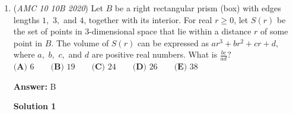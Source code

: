 \begin{enumerate}
 



\textbf{Solution 6 (Very Factor Bashy CRT)}

We note that:
 \[\frac{(52)(51)(50)(49)(48)(47)(46)(45)(44)(43)}{(10)(9)(8)(7)(6)(5)(4)(3)(2)(1)} = (13)(17)(7)(47)(46)(5)(22)(43).\]Let $K=(13)(17)(7)(47)(46)(5)(22)(43)$. This will help us find the last two digits modulo $4$ and modulo $25$.It is obvious that $K \equiv 0 \pmod{4}$. Also (although this not so obvious), 
 \[K \equiv (13)(17)(7)(47)(46)(5)(22)(43)\] 
 \[\equiv (13)(-8)(7)(-3)(-4)(5)(-3)(-7)\] 
 \[\equiv (13)(-96)(21)(35)\] 
 \[\equiv (13)(4)(-4)(10)\] 
 \[\equiv (13)(-16)(10)\] 
 \[\equiv (13)(9)(10)\] 
 \[\equiv (117)(10)\] 
 \[\equiv (-8)(10)\] 
 \[\equiv 20 \pmod{25}.\] Therefore, $K \equiv 20 \mod 100$. Thus $K=20$, implying that $\boxed{\textbf{(A) }2}$.

 



\textbf{Solution 7 (STRAIGHT BASH!!!)}

Compute $\frac{52!}{10!42!} = 15820024220.$ Therefore our answer is $\boxed {\textbf{(A)2}}.$

 Note: This is a very impractical solution for the AMC 10, here only for fun.

 



\textbf{Solution 8}

We first note we are trying to find $\binom{52}{10}$. Applying Lucas' Theorem with mod 3 obtains $\binom{52}{10} \equiv 2 \pmod{3}$, but 
 \[158A00A4AA0 \equiv 1+5+8+A+0+0+A+4+A+A+0 \equiv A \pmod{3}\] and therefore $A \equiv 2 \pmod{3}$. The only answer choice satisfying this is $A=\boxed{\textbf{(A) }2}$



	\item (\textit{AMC 10 10B 2020}) Let $B$ be a right rectangular prism (box) with edges lengths $1,$ $3,$ and $4$, together with its interior. For real $r\geq0$, let $S(r)$ be the set of points in $3$-dimensional space that lie within a distance $r$ of some point in $B$. The volume of $S(r)$ can be expressed as $ar^{3} + br^{2} + cr +d$, where $a,$ $b,$ $c,$ and $d$ are positive real numbers. What is $\frac{bc}{ad}?$
$\textbf{(A) } 6 \qquad\textbf{(B) } 19 \qquad\textbf{(C) } 24 \qquad\textbf{(D) } 26 \qquad\textbf{(E) } 38$

 \textbf{Answer: }B



\textbf{Solution 1}


\end{enumerate}
